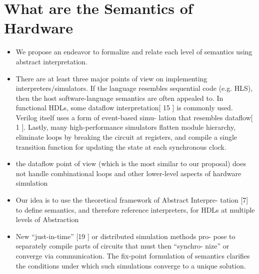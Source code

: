 \documentclass[]{article}
\begin{document}
\section{What are the Semantics of Hardware}
\begin{itemize}
    \item We propose an endeavor to formalize
    and relate each level of semantics using abstract interpretation.
    \item There are at least three major points of view on implementing
    interpreters/simulators. If the language resembles sequential code
    (e.g. HLS), then the host software-language semantics are often
    appealed to. In functional HDLs, some dataflow interpretation[ 15 ]
    is commonly used. Verilog itself uses a form of event-based simu-
    lation that resembles dataflow[ 1 ]. Lastly, many high-performance
    simulators flatten module hierarchy, eliminate loops by breaking
    the circuit at registers, and compile a single transition function for
    updating the state at each synchronous clock.
    \item the dataflow point of
    view (which is the most similar to our proposal) does not handle
    combinational loops and other lower-level aspects of hardware
    simulation
    \item Our idea is to use the theoretical framework of Abstract Interpre-
    tation [7] to define semantics, and therefore reference interpreters,
    for HDLs at multiple levels of Abstraction
    \item New “just-in-time” [19 ] or distributed simulation methods pro-
    pose to separately compile parts of circuits that must then “synchro-
    nize” or converge via communication. The fix-point formulation
    of semantics clarifies the conditions under which such simulations
    converge to a unique solution.
\end{itemize}
\end{document}
